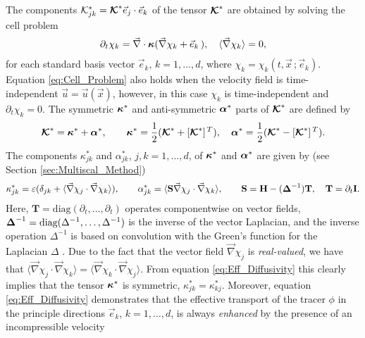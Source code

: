 \documentclass[11pt]{amsart}
\newcommand{\Tb}{\mathbf{T}}
\newcommand{\Hb}{\mathbf{H}}
\newcommand{\Ib}{\mathbf{I}}
\newcommand{\Sb}{\mathbf{S}}
\newcommand{\Kc}{\mathcal{K}}
\newcommand\Kbc{\mbox{\boldmath${\mathcal{K}}$}}
\newcommand\balpha{\mbox{\boldmath${\alpha}$}}
\newcommand\bDelta{\mbox{\boldmath${\Delta}$}}
\newcommand\bkappa{\mbox{\boldmath${\kappa}$}}
\begin{document}
The components $\Kc^*_{jk}=\Kbc^*\vec{e}_j\cdot\vec{e}_k$ of the tensor
$\Kbc^*$ are obtained by solving the cell problem
\cite{Fannjiang:SIAM_JAM:333} 
% 
\begin{align}\label{eq:Cell_Problem}
  \partial_t\chi_k=\vec{\nabla}\cdot\bkappa(\vec{\nabla}\chi_k+\vec{e}_k\,), \quad
  \langle\vec{\nabla}\chi_k\rangle=0,
\end{align}
%
for each standard basis vector $\vec{e}_k$, $k=1,\ldots,d$, where
$\chi_k=\chi_k(t,\vec{x}\,;\vec{e}_k)$. Equation \eqref{eq:Cell_Problem}
also holds \cite{Fannjiang:SIAM_JAM:333} when the velocity field is
time-independent $\vec{u}=\vec{u}(\vec{x})$, however, in this case
$\chi_k$ is time-independent and $\partial_t\chi_k=0$. The symmetric $\bkappa^*$ and
anti-symmetric $\balpha^*$ parts of $\Kbc^*$ are defined by
%
\begin{align}\label{eq:Symm_Anti-Symm}
  \Kbc^*=\bkappa^*+\balpha^*,\qquad
  \bkappa^*=\frac{1}{2}(\Kbc^*+[\Kbc^*]^{\,T}), \quad
  \balpha^*=\frac{1}{2}(\Kbc^*-[\Kbc^*]^{\,T}).
\end{align}
%
The components $\kappa^*_{jk}$ and $\alpha^*_{jk}$, $j,k=1,\ldots,d$, of $\bkappa^*$
and $\balpha^*$ are given by (see Section \ref{sec:Multiscal_Method}) 
%
\begin{align}\label{eq:Eff_Diffusivity}
 \kappa^*_{jk}=\varepsilon(\delta_{jk}+\langle\vec{\nabla}\chi_j\cdot\vec{\nabla}\chi_k\rangle), \qquad
 \alpha^*_{jk}=\langle\Sb\vec{\nabla}\chi_j\cdot\vec{\nabla}\chi_k\rangle, \qquad
 \Sb=\Hb-(\bDelta^{-1})\Tb, \quad \Tb=\partial_t\Ib.
\end{align}
%
Here, $\Tb=\text{diag}(\partial_t,\ldots,\partial_t)$ operates componentwise on
vector fields, $\bDelta^{-1}=\text{diag}(\Delta^{-1},\ldots,\Delta^{-1})$
is the inverse of the vector Laplacian, and the inverse operation
$\Delta^{-1}$ is based on convolution with the Green's 
function for the Laplacian $\Delta$ \cite{Stakgold:BVP:2000}. Due to the
fact that the vector field $\vec{\nabla}\chi_j$ is \emph{real-valued}, we have
that $\langle\vec{\nabla}\chi_j\cdot\vec{\nabla}\chi_k\rangle=\langle\vec{\nabla}\chi_k\cdot\vec{\nabla}\chi_j\rangle$. From equation 
\eqref{eq:Eff_Diffusivity} this clearly implies that the tensor   
$\bkappa^*$ is symmetric, $\kappa^*_{jk}=\kappa^*_{kj}$. Moreover, equation
\eqref{eq:Eff_Diffusivity} demonstrates that the effective transport
of the tracer $\phi$ in the principle directions $\vec{e}_k$, $k=1,\ldots,d$,
is always \emph{enhanced} by the presence of an incompressible velocity
\end{document}
